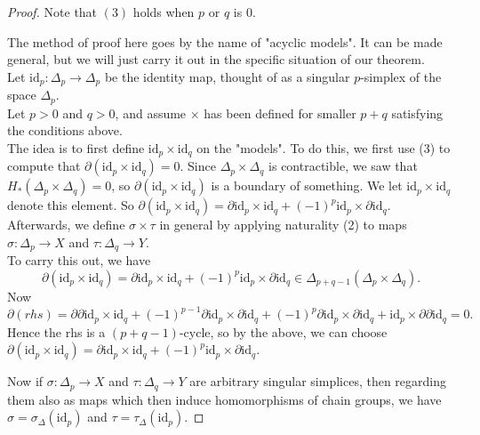 \documentclass[reqno]{amsart}
\theoremstyle{definition}
\theoremstyle{remark}
\newcommand{\id}{{\mathrm{id}}}
\begin{document}
\begin{proof}
    Note that $(3)$ holds when
    $p$ or $q$ is $0$.\\
    \linebreak
    
    The method of proof here goes by
    the name of "acyclic models". It can be made general, but
    we will just carry it out in the specific situation
    of our theorem.\\
    \linebreak
    Let $\id_p \colon \Delta_p \to \Delta_p$ be the
    identity map, thought of as a singular
    $p$-simplex of the space  $\Delta_p$.\\
    
    Let $p>0$ and $q>0$, and assume $\times $ has been
    defined for smaller $p+q$ satisfying the conditions above.\\
    The idea is to first define
    $\id_p \times \id_q$ on the "models".
    To do this, we first use (3) to compute that
    $\partial \left( \id_p \times \id_q \right) = 0$.
    Since $\Delta_p \times \Delta_q$ is contractible, we saw
    that $H_* \left( \Delta_p \times \Delta_q \right) = 0$, so
    $\partial \left( \id_p \times \id_q \right) $ is a 
    boundary of something. We let
    $\id_p \times \id_q$ denote this element. So
    $\partial \left( \id_p \times \id_q \right) =
    \partial \id_p \times \id_q +
    (-1)^{p} \id_p \times \partial \id_q$. Afterwards,
    we define $\sigma \times \tau$ in general by applying
    naturality (2) to maps
    $\sigma \colon \Delta_p \to X$ and
    $\tau \colon \Delta_q \to Y$.\\
    \linebreak
    To carry this out, we have
    \[
    \partial \left( \id_p \times \id_q \right) 
    = \partial \id_p \times \id_q + 
    (-1)^{p} \id_p \times \partial \id_q
    \in \Delta_{p+q-1}\left( \Delta_p \times \Delta_q \right) .
    \] 
    Now
    \[
    \partial (rhs) = 
    \partial \partial \id_p \times \id_q 
    +(-1)^{p-1} \partial \id_p \times \partial \id_q
    + (-1)^{p} \partial \id_p \times \partial \id_q
    +  \id_p \times \partial \partial \id_q = 0.
    \] 
    Hence the rhs is a $(p+q-1)$-cycle, so by the above,
    we can choose $\partial \left( \id_p \times \id_q \right) 
    = \partial \id_p \times \id_q + (-1)^{p} \id_p \times 
    \partial \id_q$.

    Now if $\sigma \colon \Delta_p \to X$ and
    $\tau \colon \Delta_q \to Y$ are arbitrary singular
    simplices, then
    regarding them also as maps which then
    induce homomorphisms of chain groups, we have
    $\sigma = \sigma_{\Delta}(\id_p)$ and
    $\tau = \tau_{\Delta}(\id_p)$.


\end{proof}
\end{document}
